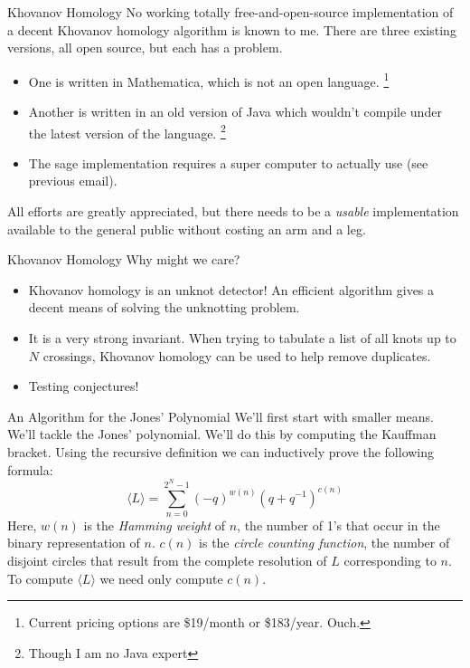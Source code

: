 \documentclass{beamer}
\begin{document}
    \begin{frame}{Khovanov Homology}
        No working totally free-and-open-source implementation of a decent
        Khovanov homology algorithm is known to me. There are three existing
        versions, all open source, but each has a problem.
        \begin{itemize}
            \item One is written in Mathematica, which is not an open language.%
                  \footnote{Current pricing options are \$19/month
                            or \$183/year. Ouch.}
            \item Another is written in an old version of Java which wouldn't
                  compile under the latest version of the language.%
                  \footnote{Though I am no Java expert}
            \item The sage implementation requires a super computer to actually
                  use (see previous email).
        \end{itemize}
        All efforts are greatly appreciated, but there needs to be a
        \textit{usable} implementation available to the general public without
        costing an arm and a leg.
    \end{frame}
    \begin{frame}{Khovanov Homology}
        Why might we care?
        \begin{itemize}
            \item Khovanov homology is an unknot detector!
                  An efficient algorithm gives a decent means of solving
                  the unknotting problem.
            \item It is a very strong invariant. When trying to tabulate a list
                  of all knots up to $N$ crossings, Khovanov homology can be
                  used to help remove duplicates.
            \item Testing conjectures!
        \end{itemize}
    \end{frame}
    \begin{frame}{An Algorithm for the Jones' Polynomial}
        We'll first start with smaller means. We'll tackle the Jones'
        polynomial. We'll do this by computing the Kauffman bracket. Using the
        recursive definition we can inductively prove the following formula:
        \begin{equation}
            \label{eqn:kauffman_bracket}%
            \langle{L}\rangle=\sum_{n=0}^{2^{N}-1}
                (-q)^{w(n)}(q+q^{-1})^{c(n)}
        \end{equation}
        Here, $w(n)$ is the \textit{Hamming weight} of $n$, the number of 1's
        that occur in the binary representation of $n$. $c(n)$ is the
        \textit{circle counting function}, the number of disjoint circles that
        result from the complete resolution of $L$ corresponding to $n$.
        To compute $\langle{L}\rangle$ we need only compute $c(n)$.
    \end{frame}
\end{document}
